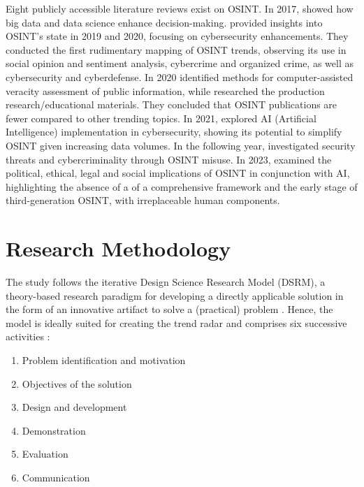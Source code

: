 \documentclass[10pt]{article}
\begin{document}
Eight publicly accessible literature reviews exist on OSINT. In 2017, \cite{DosPassos.2017} showed how big data and data science enhance decision-making. \cite{PastorGalindo.2019, PastorGalindo.2020}
provided insights into OSINT's state in 2019 and 2020, focusing on cybersecurity
enhancements. They conducted the first rudimentary mapping of OSINT trends, observing its use in social opinion and sentiment
analysis, cybercrime and organized crime, as well as cybersecurity and cyberdefense. In 2020 \cite{GarciaLozano.2020} identified methods for computer-assisted veracity assessment of public information, while
\cite{HerreraCubides.2020} researched the production research/educational materials. They concluded that OSINT
publications are fewer compared to other trending topics. In 2021, \cite{Yogish.2021} explored AI (Artificial Intelligence) implementation in cybersecurity,
showing its potential to simplify OSINT given increasing data volumes. In the following year,
\cite{Hwang.2022} investigated security threats and cybercriminality through OSINT misuse.
In 2023, \cite{Ghioni.2023} examined the political, ethical, legal and social implications of
OSINT in conjunction with AI, highlighting the absence of a of a comprehensive framework and the early stage of third-generation OSINT, with irreplaceable human components.

\section{Research Methodology}

The study follows the iterative Design Science Research Model (DSRM),
a theory-based research paradigm for developing a directly applicable solution in the form of an innovative artifact \cite{vomBrocke.2020b}
to solve a (practical) problem \cite{Peffers.2007}. Hence, the model is ideally suited for creating the trend radar and comprises
six successive activities \cite{Peffers.2007}:

\begin{enumerate}
    \item Problem identification and motivation
    \item Objectives of the solution
    \item Design and development
    \item Demonstration
    \item Evaluation
    \item Communication
\end{enumerate}
\end{document}
